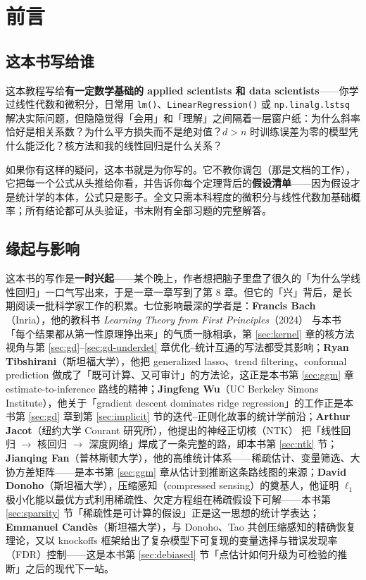 \section*{前言}\label{sec:preface}

\subsection*{这本书写给谁}

这本教程写给\textbf{有一定数学基础的 applied scientists 和 data scientists}——你学过线性代数和微积分，日常用 \texttt{lm()}、\texttt{LinearRegression()} 或 \texttt{np.linalg.lstsq} 解决实际问题，但隐隐觉得「会用」和「理解」之间隔着一层窗户纸：为什么斜率恰好是相关系数？为什么平方损失而不是绝对值？$d > n$ 时训练误差为零的模型凭什么能泛化？核方法和我的线性回归是什么关系？

如果你有这样的疑问，这本书就是为你写的。它不教你调包（那是文档的工作），它把每一个公式从头推给你看，并告诉你每个定理背后的\textbf{假设清单}——因为假设才是统计学的本体，公式只是影子。全文只需本科程度的微积分与线性代数加基础概率；所有结论都可从头验证，书末附有全部习题的完整解答。

\subsection*{缘起与影响}

这本书的写作是\textbf{一时兴起}——某个晚上，作者想把脑子里盘了很久的「为什么学线性回归」一口气写出来，于是一章一章写到了第 8 章。但它的「兴」背后，是长期阅读一批科学家工作的积累。七位影响最深的学者是：\textbf{Francis Bach}（Inria），他的教科书 \emph{Learning Theory from First Principles}（2024）\cite{bach2024} 与本书「每个结果都从第一性原理挣出来」的气质一脉相承，第 \ref{sec:kernel} 章的核方法视角与第 \ref{sec:gd}--\ref{sec:gd-underdet} 章优化--统计互通的写法都受其影响；\textbf{Ryan Tibshirani}（斯坦福大学），他把 generalized lasso、trend filtering、conformal prediction 做成了「既可计算、又可审计」的方法论，这正是本书第 \ref{sec:ggm} 章 estimate-to-inference 路线的精神；\textbf{Jingfeng Wu}（UC Berkeley Simons Institute），他关于「gradient descent dominates ridge regression」的工作\cite{wu2025}正是本书第 \ref{sec:gd} 章到第 \ref{sec:implicit} 节的迭代--正则化故事的统计学前沿；\textbf{Arthur Jacot}（纽约大学 Courant 研究所），他提出的神经正切核（NTK）\cite{jacot2018} 把「线性回归 $\to$ 核回归 $\to$ 深度网络」焊成了一条完整的路，即本书第 \ref{sec:ntk} 节；\textbf{Jianqing Fan}（普林斯顿大学），他的高维统计体系\cite{fan2020}——稀疏估计、变量筛选、大协方差矩阵——是本书第 \ref{sec:ggm} 章从估计到推断这条路线图的来源；\textbf{David Donoho}（斯坦福大学），压缩感知（compressed sensing）的奠基人，他证明 $\ell_1$ 极小化能以最优方式利用稀疏性、欠定方程组在稀疏假设下可解\cite{donoho2006}——本书第 \ref{sec:sparsity} 节「稀疏性是可计算的假设」正是这一思想的统计学表达；\textbf{Emmanuel Candès}（斯坦福大学），与 Donoho、Tao 共创压缩感知的精确恢复理论，又以 knockoffs 框架给出了复杂模型下可复现的变量选择与错误发现率（FDR）控制\cite{barber2015}——这是本书第 \ref{sec:debiased} 节「点估计如何升级为可检验的推断」之后的现代下一站。

